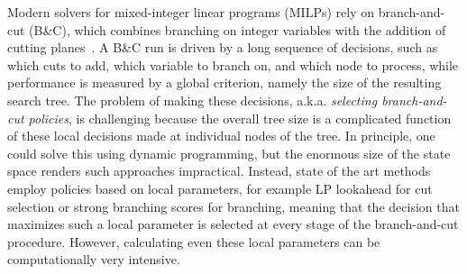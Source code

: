 \documentclass[smallextended,envcountsect]{svjour3} %
\newcommand{\0}{\mathbf{0}}
\newcommand{\1}{\mathbf{1}} %
\begin{document}
Modern solvers for mixed-integer linear programs (MILPs) rely on branch-and-cut (B\&C), which combines branching on integer variables with the addition of cutting planes~\cite{land2009automatic,nemhauser1988integer,conforti2014integer}.
A B\&C run is driven by a long sequence of decisions, such as which cuts to add, which variable to branch on, and which node to process, while performance is measured by a global criterion, namely the size of the resulting search tree. The problem of making these decisions, a.k.a. {\em selecting branch-and-cut policies}, is challenging because the overall tree size is a complicated function of these local decisions made at individual nodes of the tree. In principle, one could solve this using dynamic programming, but the enormous size of the state space renders such approaches impractical. Instead, state of the art methods employ policies based on local parameters, for example LP lookahead for cut selection or strong branching scores for branching, meaning that the decision that maximizes such a local parameter is selected at every stage of the branch-and-cut procedure. However, calculating even these local parameters can be computationally very intensive.
\end{document}
